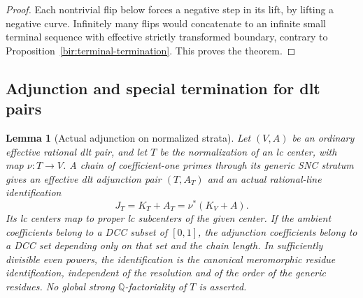 \documentclass[11pt,letterpaper]{article}
\newtheorem{lemma}[theorem]{Lemma}
\theoremstyle{definition}
\theoremstyle{remark}
\begin{document}
\begin{proof}
Each nontrivial flip below forces a negative step in its lift, by
lifting a negative curve.  Infinitely many flips would concatenate
to an infinite small terminal sequence with effective strictly
transformed boundary, contrary to
Proposition~\ref{bir:terminal-termination}.  This proves the theorem.
\end{proof}

\subsection{Adjunction and special termination for dlt pairs}
\label{bir:dlt-section}

\begin{lemma}[Actual adjunction on normalized strata]
\label{bir:stratum-adjunction}
Let $(V,A)$ be an ordinary effective rational dlt pair, and let $T$
be the normalization of an lc center, with map $\nu:T\to V$.  A
chain of coefficient-one primes through its generic SNC stratum
gives an effective dlt adjunction pair $(T,A_T)$ and an actual
rational-line identification
\begin{equation}
 J_T=K_T+A_T=\nu^*(K_V+A).
 \label{bir:stratum-line}
\end{equation}
Its lc centers map to proper lc subcenters of the given center.
If the ambient coefficients belong to a DCC subset of $[0,1]$, the
adjunction coefficients belong to a DCC set depending only on that
set and the chain length.  In sufficiently divisible even powers,
the identification is the canonical meromorphic residue
identification, independent of the resolution and of the order of
the generic residues.  No global strong $\mathbb{Q}$-factoriality of $T$ is
asserted.
\end{lemma}
\end{document}
